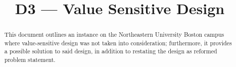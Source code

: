 \documentclass[conference]{IEEEtran}
\begin{document}
\title{D3 — Value Sensitive Design}

\author{
}

\maketitle

\begin{abstract}
  This document outlines an instance on the Northeastern University Boston campus where value-sensitive design was not taken into consideration; furthermore, it provides a possible solution to said design, in addition to restating the design as reformed problem statement.
\end{abstract}
\end{document}
